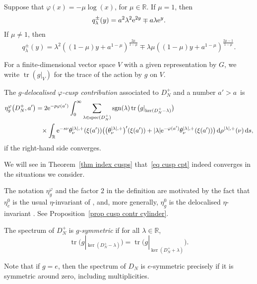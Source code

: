 \documentclass[10pt,a4paper]{amsart}
\numberwithin{equation}{section}
\DeclareMathOperator{\tr}{tr}
\DeclareMathOperator{\spec}{spec}
\DeclareMathOperator{\sgn}{sgn}
\newcommand{\R}{\mathbb{R}}
\begin{document}
\begin{Example}%
Suppose that $\varphi(x) = -\mu\log(x)$, for $\mu \in \R$. If $\mu = 1$, then
\[
q_{\lambda}^{\pm}(y) = a^2 \lambda^2 {\rm e}^{2y} \mp a\lambda {\rm e}^y.
\]
If $\mu \not = 1$, then
\[
q_{\lambda}^{\pm}(y) = \lambda^2 \left( (1-\mu)y+a^{1-\mu} \right)^{\frac{2\mu}{1-\mu}} \mp \lambda \mu \left( (1-\mu)y + a^{1-\mu}\right)^{\frac{2\mu - 1}{1-\mu}}.
\]
\end{Example}

For a finite-dimensional vector space $V$ with a given representation by $G$, we write $\tr(g|_V)$ for the trace of the action by $g$ on $V$.
\begin{Definition}\label{def cusp cpt}
The \emph{$g$-delocalised $\varphi$-cusp contribution} associated to $D_N^+$ and a number ${a'>a}$~is
\begin{align}
\eta^{\varphi}_g\big(D_N^+, a'\big)&=2 {\rm e}^{-p\varphi(a')} \int_{0}^{\infty}
\sum_{\lambda \in \spec(D_N^+)}\sgn(\lambda) \tr\big(g|_{\ker(D_N^+ - \lambda)}\big)
\label{eq cusp cpt}
\\
&\phantom{=} \times
\int_{\R} {\rm e}^{-s\nu}
\theta^{|\lambda|, +}_{\nu} (\xi(a'))
 \big(\big(\theta^{|\lambda|, +}_{\nu} \big)'(\xi(a')) +|\lambda| {\rm e}^{-\varphi(a')} \theta^{|\lambda|, +}_{\nu} (\xi(a'))
 \big)\,{\rm d}\rho^{|\lambda|, +}(\nu)\nonumber
 \, {\rm d}s,
\end{align}
if the right-hand side converges.
\end{Definition}
We will see in Theorem~\ref{thm index cusps} that~\eqref{eq cusp cpt} indeed converges in the situations we consider.

The notation $\eta^{\varphi}_g$ and the factor $2$ in the definition are motivated by the fact that $\eta^0_e$ is the usual $\eta$-invariant of \cite{APS1}, and, more generally, $\eta^0_g$ is the delocalised $\eta$-invariant \cite{Donnelly}. See Proposition~\ref{prop cusp contr cylinder}.

\begin{Definition}%
The spectrum of $D_N^+$ is \emph{$g$-symmetric} if for all $\lambda \in \R$,
\[
\tr\big(g|_{\ker(D_N^+ - \lambda)}\big) = \tr\big(g|_{\ker(D_N^+ + \lambda)}\big).
\]
\end{Definition}
Note that if $g=e$, then the spectrum of $D_N$ is {$e$-symmetric} precisely if it is symmetric around zero, including multiplicities.
\end{document}
